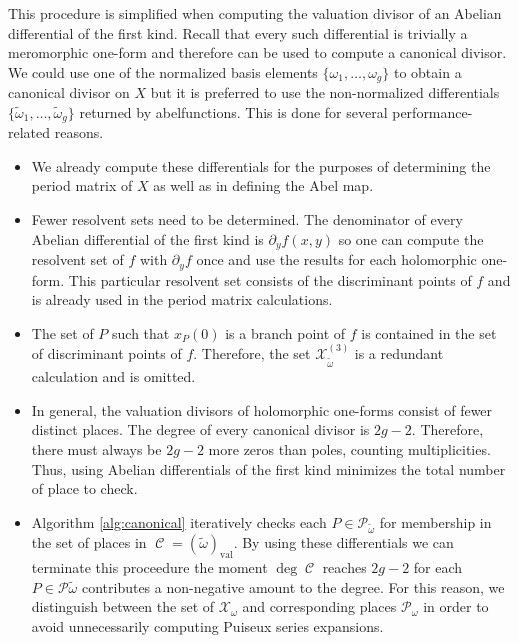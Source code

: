 \documentclass[12pt]{article}
\theoremstyle{definition}
\DeclareMathOperator{\DivC}{\mathcal{C}}
\begin{document}
This procedure is simplified when computing the valuation divisor of an
Abelian differential of the first kind. Recall that every such
differential is trivially a meromorphic one-form and therefore can be
used to compute a canonical divisor. We could use one of the normalized
basis elements $\{\omega_1, \ldots, \omega_g\}$ to obtain a canonical
divisor on $X$ but it is preferred to use the non-normalized
differentials $\{\tilde{\omega}_1, \ldots, \tilde{\omega}_g\}$ returned
by {\sc abelfunctions}. This is done for several performance-related
reasons.
\begin{itemize}
\item We already compute these differentials for the purposes of
  determining the period matrix of $X$ as well as in defining the Abel
  map.
\item Fewer resolvent sets need to be determined. The denominator of
  every Abelian differential of the first kind is $\partial_y f(x,y)$
  \cite{Noether83,Brieskorn86} so one can compute the resolvent set of
  $f$ with $\partial_y f$ once and use the results for each holomorphic
  one-form. This particular resolvent set consists of the discriminant
  points of $f$ and is already used in the period matrix calculations.
\item The set of $P$ such that $x_P(0)$ is a branch point of $f$ is
  contained in the set of discriminant points of $f$. Therefore, the set
  $\mathcal{X}_{\tilde{\omega}}^{(3)}$ is a redundant calculation and is
  omitted.
\item In general, the valuation divisors of holomorphic one-forms
  consist of fewer distinct places. The degree of every canonical
  divisor is $2g-2$. Therefore, there must always be $2g-2$ more zeros
  than poles, counting multiplicities. Thus, using Abelian differentials
  of the first kind minimizes the total number of place to check.
\item Algorithm \ref{alg:canonical} iteratively checks each $P \in
  \mathcal{P}_{\tilde{\omega}}$ for membership in the set of places in
  $\DivC = (\tilde{\omega})_\text{val}$. By using these differentials we
  can terminate this proceedure the moment $\deg \DivC$ reaches $2g-2$
  for each $P\in\mathcal{P}{\tilde{\omega}}$ contributes a non-negative
  amount to the degree. For this reason, we distinguish between the set
  of $\mathcal{X}_\omega$ and corresponding places $\mathcal{P}_\omega$
  in order to avoid unnecessarily computing Puiseux series expansions.
\end{itemize}
\end{document}
